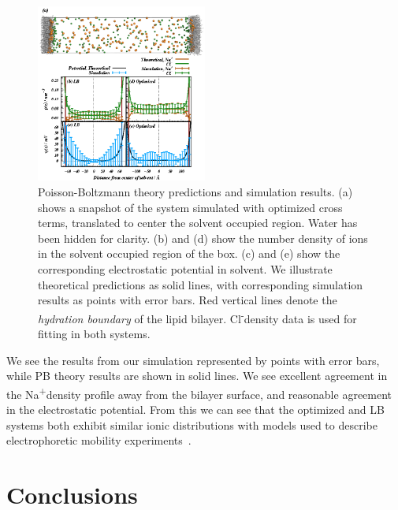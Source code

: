 \documentclass[12pt,openany,final]{book}
\newcommand{\na}{Na\textsuperscript{+}}
\newcommand{\cl}{Cl\textsuperscript{-}}
\begin{document}
\begin{figure}[h!]
    \caption[Poisson-Boltzmann theory]{ Poisson-Boltzmann theory predictions and simulation results. (a) shows a snapshot of the 
system simulated with optimized cross terms, translated
to center the solvent occupied region. Water has been hidden
for clarity. (b) and (d)
    show the number density of ions in the solvent occupied region of the box. 
    (c) and (e) show the corresponding electrostatic potential in solvent.
    We illustrate theoretical predictions as solid lines, with corresponding 
    simulation results as points with error bars. Red vertical lines denote the \emph{hydration boundary} of the lipid bilayer. 
    \cl density data is used for fitting in both systems. 
}
    \label{fig:gouy:ch1}
    \includegraphics[width=0.5\textwidth,trim=0 0 0 0]{figure_s4_ch1.eps}
\end{figure}
We see the results from our simulation
represented by points with error bars, while PB theory results are
shown in solid lines.  We see excellent agreement in the \na density
profile away from the bilayer surface, and reasonable agreement in the
electrostatic potential. From this we can see that the optimized and LB
systems both exhibit similar ionic distributions with models used to
describe electrophoretic mobility
experiments~\cite{israelachvili:2011:intermol}.

\section{Conclusions}
\end{document}
